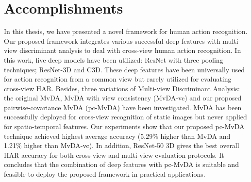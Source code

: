 
\section{Accomplishments}
    In this thesis, we have presented a novel framework for human action recognition. Our proposed framework integrates various successful deep features with multi-view discriminant analysis to deal with cross-view human action recognition. In this work, five deep models have been utilized: ResNet with three pooling techniques; ResNet-3D and C3D. These deep features have been universally used for action recognition from a common view but rarely utilized for evaluating cross-view HAR. Besides, three variations of Multi-view Discriminant Analysis: the original MvDA, MvDA with view consistency (MvDA-vc) and our proposed pairwise-covariance MvDA (pc-MvDA) have been investigated. MvDA has been successfully deployed for cross-view recognition of static images but never applied for spatio-temporal features. Our experiments show that our proposed pc-MvDA technique achieved highest average accuracy (5.29\% higher than MvDA and 1.21\% higher than MvDA-vc). In addition, ResNet-50 3D gives the best overall HAR accuracy for both cross-view and multi-view evaluation protocols. It concludes that the combination of deep features with pc-MvDA is suitable and feasible to deploy the proposed framework in practical applications. 
